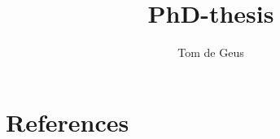 \documentclass[twocolumnbib]{goose-thesis}
\title{PhD-thesis}
\author{Tom de Geus}
\begin{document}
\maketitle

\setcounter{tocdepth}{0}
\tableofcontents

\cleardoublepage


\cleardoublepage


\cleardoublepage
\renewcommand{\bibsection}{}
\chapter*{References}


\end{document}
